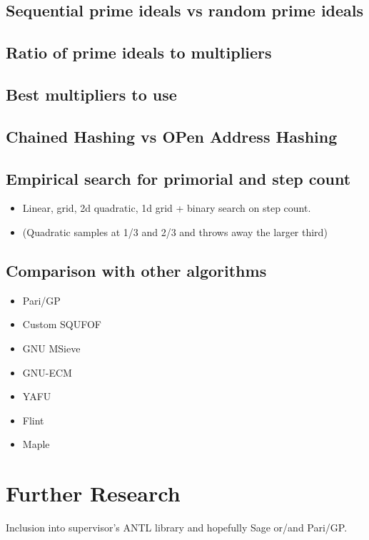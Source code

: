 \documentclass{ucalgthes1}
\theoremstyle{definition}
\begin{document}
\section{Sequential prime ideals vs random prime ideals}

\section{Ratio of prime ideals to multipliers}

\section{Best multipliers to use}

\section{Chained Hashing vs OPen Address Hashing}

\section{Empirical search for primorial and step count}
\begin{itemize}
\item Linear, grid, 2d quadratic, 1d grid + binary search on step count.
\item (Quadratic samples at 1/3 and 2/3 and throws away the larger third)
\end{itemize}

\section{Comparison with other algorithms}
\begin{itemize}
\item Pari/GP
\item Custom SQUFOF
\item GNU MSieve
\item GNU-ECM
\item YAFU
\item Flint
\item Maple
\end{itemize}

\chapter{Further Research}

Inclusion into supervisor's ANTL library and hopefully Sage or/and Pari/GP.
\end{document}
